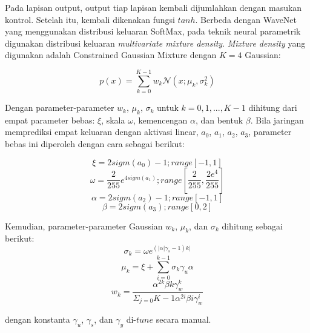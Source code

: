 Pada lapisan output, output tiap lapisan kembali dijumlahkan dengan masukan kontrol. Setelah itu, kembali dikenakan fungsi $tanh$\parencite{bonada2017singing}. Berbeda dengan WaveNet \parencite{Oord2016WaveNetAG} yang menggunakan distribusi keluaran SoftMax, pada teknik neural parametrik digunakan distribusi keluaran \textit{multivariate mixture density}. \textit{Mixture density} yang digunakan adalah Constrained Gaussian Mixture dengan $K=4$ Gaussian: \parencite{bonada2017singing}

\begin{equation}
    p(x) = \sum\limits_{k=0}^{K-1}w_k\mathcal{N}(x;\mu_k,\sigma_k^2)
\end{equation}\label{eq-gated-activation}

Dengan parameter-parameter $w_k$, $\mu_k$, $\sigma_k$ untuk $k=0,1,...,K-1$ dihitung dari empat parameter bebas: $\xi$, skala $\omega$, kemencengan $\alpha$, dan bentuk $\beta$. Bila jaringan memprediksi empat keluaran dengan aktivasi linear, $a_0$, $a_1$, $a_2$, $a_3$, parameter bebas ini diperoleh dengan cara sebagai berikut: \parencite{bonada2017singing}

\begin{equation}
    \xi = 2 sigm(a_0)-1; range[-1,1]
\end{equation}
\begin{equation}
    \omega = \dfrac{2}{255}e^{4sigm(a_1)}; range[\dfrac{2}{255}, \dfrac{2 e^4}{255}]
\end{equation}
\begin{equation}
    \alpha = 2 sigm(a_2)-1; range[-1,1]
\end{equation}
\begin{equation}
    \beta = 2 sigm(a_3); range[0,2]
\end{equation}

Kemudian, parameter-parameter Gaussian $w_k$, $\mu_k$, dan $\sigma_k$ dihitung sebagai berikut:\parencite{bonada2017singing}
\begin{equation}
    \sigma_k = \omega e^{(|\alpha|\gamma_s-1)k|}
\end{equation}
\begin{equation}
    \mu_k = \xi + \sum\limits_{i=0}^{k-1}\sigma_k\gamma_u\alpha
\end{equation}
\begin{equation}
    w_k = \dfrac{\alpha^{2k}\beta{k}\gamma_w^k}{\Sigma_{j=0}{K-1}\alpha^{2i}\beta{i}\gamma_w^i}
\end{equation}

dengan konstanta $\gamma_u$, $\gamma_s$, dan $\gamma_y$ di-$tune$ secara manual.